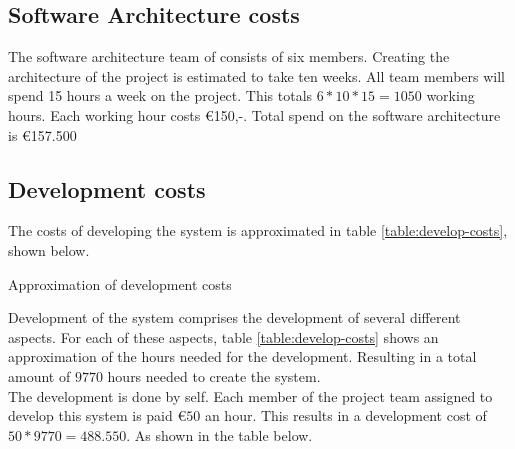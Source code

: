 \subsection{Software Architecture costs}
The software architecture team of \CompanyName consists of six members. Creating the architecture of the project is estimated to take ten weeks. All team members will spend 15 hours a week on the project. This totals $6*10*15=1050$ working hours. Each working hour costs \euro{}150,-. Total spend on the software architecture is \euro{}157.500
\subsection{Development costs}
The costs of developing the system is approximated in table \ref{table:develop-costs}, shown below.
\newline

\begin{table}[H]
	\caption{Approximation of development costs}
	\label{table:develop-costs}
\end{table}
Development of the system comprises the development of several different aspects. For each of these aspects, table \ref{table:develop-costs} shows an approximation of the hours needed for the development. Resulting in a total amount of $9770$ hours needed to create the system.\\
The development is done by \CompanyName self. Each member of the project team assigned to develop this system is paid $\euro{}50$ an hour. This results in a development cost of $50*9770=488.550$. As shown in the table below.

